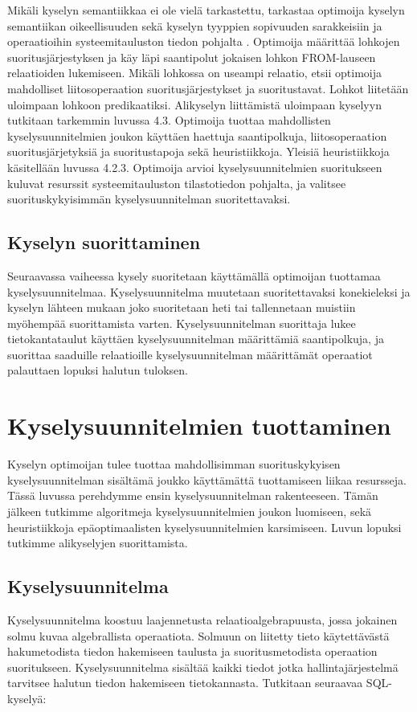 \documentclass[finnish]{tktltiki2}
\theoremstyle{definition}
\theoremstyle{remark}
\begin{document}
Mikäli kyselyn semantiikkaa ei ole vielä tarkastettu, tarkastaa optimoija kyselyn semantiikan oikeellisuuden sekä kyselyn tyyppien sopivuuden sarakkeisiin ja operaatioihin systeemitauluston tiedon pohjalta \cite{selinger1979access}. Optimoija määrittää lohkojen suoritusjärjestyksen ja käy läpi saantipolut jokaisen lohkon FROM-lauseen relaatioiden lukemiseen. 
Mikäli lohkossa on useampi relaatio, etsii optimoija mahdolliset liitosoperaation suoritusjärjestykset ja suoritustavat. Lohkot liitetään uloimpaan lohkoon predikaatiksi. Alikyselyn liittämistä uloimpaan kyselyyn tutkitaan tarkemmin luvussa 4.3. Optimoija tuottaa mahdollisten kyselysuunnitelmien joukon käyttäen haettuja saantipolkuja, liitosoperaation suoritusjärjetyksiä ja suoritustapoja sekä heuristiikkoja. Yleisiä heuristiikkoja käsitellään luvussa 4.2.3. Optimoija arvioi kyselysuunnitelmien suoritukseen kuluvat resurssit systeemitauluston tilastotiedon pohjalta, ja valitsee suorituskykyisimmän kyselysuunnitelman suoritettavaksi.

\subsection{Kyselyn suorittaminen}
Seuraavassa vaiheessa kysely suoritetaan käyttämällä optimoijan tuottamaa kyselysuunnitelmaa. Kyselysuunnitelma muutetaan suoritettavaksi konekieleksi ja kyselyn lähteen mukaan joko suoritetaan heti tai tallennetaan muistiin myöhempää suorittamista varten. Kyselysuunnitelman suorittaja lukee tietokantataulut käyttäen kyselysuunnitelman määrittämiä saantipolkuja, ja suorittaa saaduille relaatioille kyselysuunnitelman määrittämät operaatiot palauttaen lopuksi halutun tuloksen.

\section{Kyselysuunnitelmien tuottaminen} 
Kyselyn optimoijan tulee tuottaa mahdollisimman suorituskykyisen kyselysuunnitelman sisältämä joukko käyttämättä tuottamiseen liikaa resursseja. Tässä luvussa perehdymme ensin kyselysuunnitelman rakenteeseen. Tämän jälkeen tutkimme algoritmeja kyselysuunnitelmien joukon luomiseen, sekä heuristiikkoja epäoptimaalisten kyselysuunnitelmien karsimiseen. Luvun lopuksi tutkimme alikyselyjen suorittamista.

\subsection{Kyselysuunnitelma}
Kyselysuunnitelma koostuu laajennetusta relaatioalgebrapuusta, jossa jokainen solmu kuvaa algebrallista operaatiota. Solmuun on liitetty tieto käytettävästä hakumetodista tiedon hakemiseen taulusta ja suoritusmetodista operaation suoritukseen. Kyselysuunnitelma sisältää kaikki tiedot jotka hallintajärjestelmä tarvitsee halutun tiedon hakemiseen tietokannasta. Tutkitaan seuraavaa SQL-kyselyä:
\newline
\end{document}
